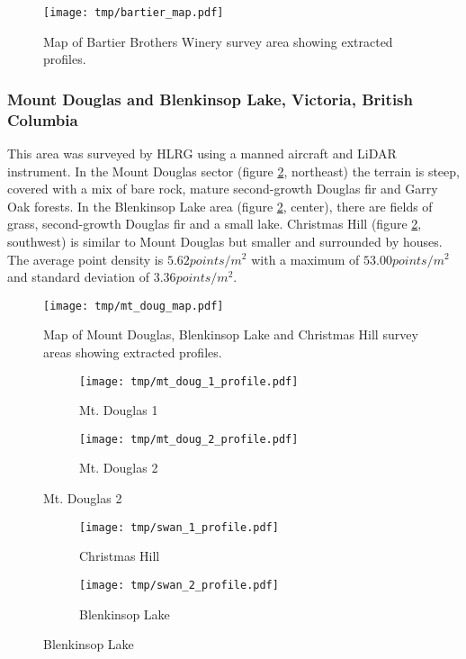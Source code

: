 \documentclass[doc]{apa6}
\begin{document}
\begin{figure} %
\texttt{[image: tmp/bartier\_map.pdf]} 
\caption{Map of Bartier Brothers Winery survey area showing extracted profiles.}
\label{fig:bartier_map}
\end{figure}


\subsubsection{Mount Douglas and Blenkinsop Lake, Victoria, British Columbia}

This area was surveyed by HLRG using a manned aircraft and LiDAR instrument. In the Mount Douglas sector (figure \ref{fig:mt_doug_map}, northeast) the terrain is steep, covered with a mix of bare rock, mature second-growth Douglas fir and Garry Oak forests. In the Blenkinsop Lake area (figure \ref{fig:mt_doug_map}, center), there are fields of grass, second-growth Douglas fir and a small lake. Christmas Hill (figure \ref{fig:mt_doug_map}, southwest) is similar to Mount Douglas but smaller and surrounded by houses. The average point density is $5.62points/m^2$ with a maximum of $53.00points/m^2$ and standard deviation of $3.36points/m^2$.

\begin{figure} %
\texttt{[image: tmp/mt\_doug\_map.pdf]} 
\caption{Map of Mount Douglas, Blenkinsop Lake and Christmas Hill survey areas showing extracted profiles.}
\label{fig:mt_doug_map}
\end{figure}


\begin{figure} %
\begin{subfigure}[b]{\linewidth}
\texttt{[image: tmp/mt\_doug\_1\_profile.pdf]} 
\caption{Mt. Douglas 1} \label{subfig:mt_doug_1}
\end{subfigure}
\begin{subfigure}[b]{\linewidth}
\texttt{[image: tmp/mt\_doug\_2\_profile.pdf]} 
\caption{Mt. Douglas 2} \label{subfig:mt_doug_2}
\end{subfigure}
\end{figure}

\begin{figure}\ContinuedFloat
\begin{subfigure}[b]{\linewidth}
\texttt{[image: tmp/swan\_1\_profile.pdf]} 
\caption{Christmas Hill} \label{subfig:swan_1}
\end{subfigure}
\begin{subfigure}[b]{\linewidth}
\texttt{[image: tmp/swan\_2\_profile.pdf]} 
\caption{Blenkinsop Lake} \label{subfig:swan_2}
\end{subfigure}
\end{figure}
\end{document}
